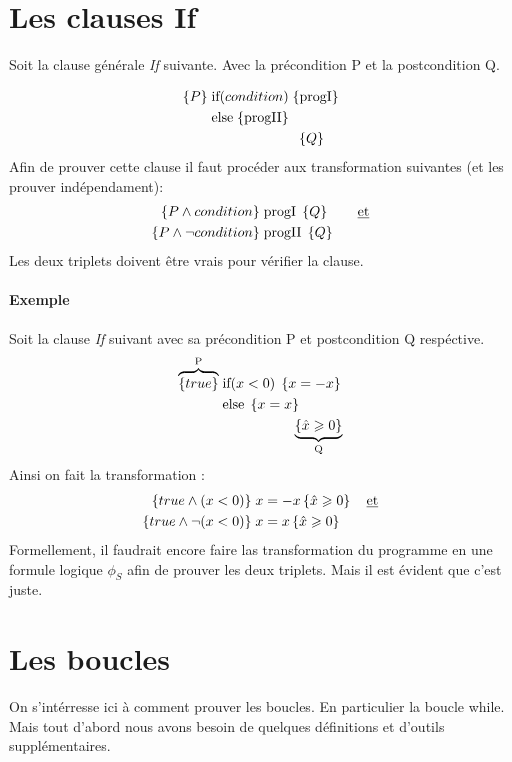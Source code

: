 \documentclass[12pt]{article}
\begin{document}
\section*{Les clauses If}
Soit la clause générale \emph{If} suivante. Avec la précondition P et la 
postcondition Q.

\begin{align*}
    \{P\}\; &\textnormal{if}(condition)\;\{\textnormal{progI}\}\\
            &\textnormal{else} \; \{\textnormal{progII}\}\\
            &\qquad \qquad \qquad \;\{Q\}
\end{align*}
Afin de prouver cette clause il faut procéder aux transformation
suivantes (et les prouver indépendament):
\begin{align*}
    \left\{P \wedge condition \right\}\; &\textnormal{progI}\; \left\{Q\right\} \qquad \text{\underline{et}}\\
    \left\{P \wedge \lnot condition \right\}\; &\textnormal{progII}\; \left\{Q\right\}
\end{align*}
Les deux triplets doivent être vrais pour vérifier la clause.

\paragraph*{Exemple}
Soit la clause \emph{If} suivant avec sa précondition P et postcondition Q
respéctive.
\begin{align*}
    \overbrace{\left\{true\right\}}^\text{P}\; &\textnormal{if} (x<0) \; \left\{x = -x\right\}\\
                          &\textnormal{else} \; \left\{x = x\right\}\\
                          &\qquad \qquad \quad \underbrace{\left\{\hat{x}\geqslant 0\right\}}_{\text{Q}}
\end{align*}
Ainsi on fait la transformation :
\begin{align*}
    \left\{true \wedge (x<0)\right\}\; &x = -x \left\{\hat{x}\geqslant 0\right\} \quad \text{\underline{et}}\\
    \left\{true \wedge \lnot (x<0)\right\}\; &x = x \left\{\hat{x}\geqslant 0\right\}
\end{align*}
Formellement, il faudrait encore faire las transformation du programme en 
une formule logique $\phi_{S}$ afin de prouver les deux triplets. Mais
il est évident que c'est juste.

\section*{Les boucles}
On s'intérresse ici à comment prouver les boucles. En particulier la boucle
while. Mais tout d'abord nous avons besoin de quelques définitions et
d'outils supplémentaires.
\end{document}

